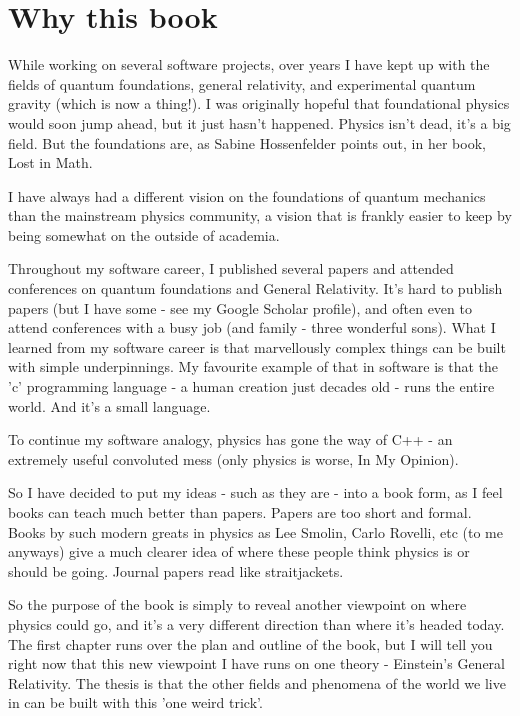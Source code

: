 \documentclass[../rzero]{subfiles}
\begin{document}
\section*{Why this book}
While working on several software projects, over years I have kept up with the fields of quantum foundations, general relativity, and experimental quantum gravity (which is now a thing!)\cite{Marletto2017}. I was originally hopeful that foundational physics would soon jump ahead, but it just hasn't happened. Physics isn't dead, it's a big field. But the foundations are, as Sabine Hossenfelder points out, in her book, Lost in Math\cite{hossenfelder2018lost}.

I have always had a different vision on the foundations of quantum mechanics than the mainstream physics community, a vision that is frankly easier to keep by being somewhat on the outside of academia.  

Throughout my software career, I published several papers and attended conferences on quantum foundations and General Relativity. It's hard to publish papers (but I have some - see my Google Scholar profile), and often even to attend conferences with a busy job (and family - three wonderful sons). What I learned from my software career is that marvellously complex things can be built with simple underpinnings. My favourite example of that in software is that the 'c' programming language - a human creation just decades old - runs the entire world. And it's a small language\cite{kernighan2002c}. 

To continue my software analogy, physics has gone the way of C++ - an extremely useful convoluted mess (only physics is worse, In My Opinion).   

So I have decided to put my ideas - such as they are - into a book form, as I feel books can teach much better than papers. Papers are too short and formal. Books by such modern greats in physics as Lee Smolin, Carlo Rovelli, etc (to me anyways) give a much clearer idea of where these people think physics is or should be going. Journal papers read like straitjackets. 

So the purpose of the book is simply to reveal another viewpoint on where physics could go, and it's a very different direction than where it's headed today. The first chapter runs over the plan and outline of the book, but I will tell you right now that this new viewpoint I have runs on one theory - Einstein's General Relativity. The thesis is that the other fields and phenomena of the world we live in can be built with this 'one weird trick'. 
\end{document}
